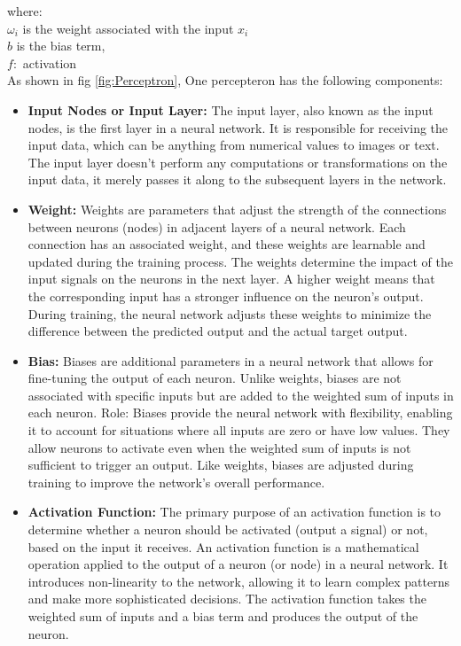 where:\\
$\omega_{i}$ is the weight associated with the input \(x_{i}\)\\
\(b\) is the bias term,\\
\(f:\) activation\\
As shown in fig \ref{fig:Perceptron}, One percepteron has the following components: \\
\begin{itemize}
    \item \textbf{Input Nodes or Input Layer: } The input layer, also known as the input nodes, is the first layer in a neural network. It is responsible for receiving the input data, which can be anything from numerical values to images or text. The input layer doesn't perform any computations or transformations on the input data, it merely passes it along to the subsequent layers in the network. \\
    \item \textbf{Weight: } Weights are parameters that adjust the strength of the connections between neurons (nodes) in adjacent layers of a neural network. Each connection has an associated weight, and these weights are learnable and updated during the training process. The weights determine the impact of the input signals on the neurons in the next layer. A higher weight means that the corresponding input has a stronger influence on the neuron's output. During training, the neural network adjusts these weights to minimize the difference between the predicted output and the actual target output. \\
    \item \textbf{Bias: } Biases are additional parameters in a neural network that allows for fine-tuning the output of each neuron. Unlike weights, biases are not associated with specific inputs but are added to the weighted sum of inputs in each neuron.
    Role: Biases provide the neural network with flexibility, enabling it to account for situations where all inputs are zero or have low values. They allow neurons to activate even when the weighted sum of inputs is not sufficient to trigger an output. Like weights, biases are adjusted during training to improve the network's overall performance. \\
    \item \textbf{Activation Function: } The primary purpose of an activation function is to determine whether a neuron should be activated (output a signal) or not, based on the input it receives.
    An activation function is a mathematical operation applied to the output of a neuron (or node) in a neural network. It introduces non-linearity to the network, allowing it to learn complex patterns and make more sophisticated decisions. The activation function takes the weighted sum of inputs and a bias term and produces the output of the neuron.\cite{nielsen2015neural}

\end{itemize}

